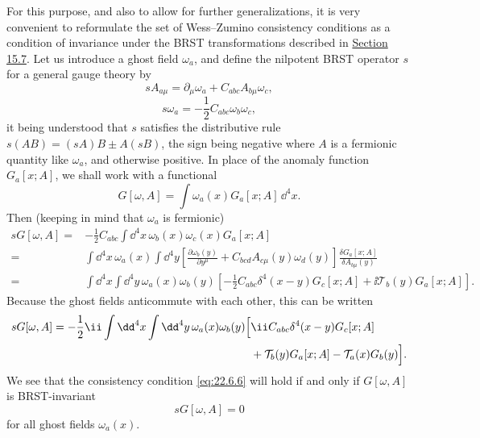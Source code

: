 For this purpose, and also to allow for further generalizations, it is very
convenient to reformulate the set of Wess--Zumino consistency conditions
as a condition of invariance under the BRST transformations described in
\hyperref[sec:15.7]{Section 15.7}. Let us introduce a ghost field
$\omega_a$, and define the nilpotent BRST operator $s$ for a general
gauge theory by
\begin{equation}
 sA_{a\mu}
 =\partial_\mu\omega_a
 +C_{abc}A_{b\mu}\omega_c,
 \tag{22.6.7}\label{eq:22.6.7}
\end{equation}
\begin{equation}
 s\omega_a
 =-\frac12 C_{abc}\omega_b\omega_c,
 \tag{22.6.8}\label{eq:22.6.8}
\end{equation}
it being understood that $s$ satisfies the distributive rule
$s(AB)=(sA)B\pm A(sB)$, the sign being negative where $A$ is a fermionic
quantity like $\omega_a$, and otherwise positive. In place of the
anomaly function $G_a[x;A]$, we shall work with a functional
\begin{equation}
 G[\omega,A]
 =\int\omega_a(x)G_a[x;A]\,\dd^4x.
 \tag{22.6.9}\label{eq:22.6.9}
\end{equation}
Then (keeping in mind that $\omega_a$ is fermionic)
\begin{align*}
 sG[\omega,A]
 ={}&-\frac12 C_{abc}
 \int \dd^4x\,\omega_b(x)\omega_c(x)G_a[x;A]
 \\
 ={}&\int \dd^4x\,\omega_a(x)\int \dd^4y
 \left[
 \frac{\partial\omega_b(y)}{\partial y^\mu}
 +C_{bcd}A_{c\mu}(y)\omega_d(y)
 \right]
 \frac{\delta G_a[x;A]}{\delta A_{b\mu}(y)}
 \\
 ={}&\int \dd^4x\int \dd^4y\,\omega_a(x)\omega_b(y)
 \left[
 -\frac12 C_{abc}\delta^4(x-y)G_c[x;A]
 +\ii\mathcal T_b(y)G_a[x;A]
 \right].
\end{align*}
Because the ghost fields anticommute with each other, this can be written
\[
 \begin{aligned}
 sG[\omega,A]
 =-\frac12 \ii\int \dd^4x\int \dd^4y\,
 \omega_a(x)\omega_b(y)
 \Bigl[
 &\ii C_{abc}\delta^4(x-y)G_c[x;A]
 \\
 &+\mathcal T_b(y)G_a[x;A]
 -\mathcal T_a(x)G_b(y)
 \Bigr].
 \end{aligned}
\]
We see that the consistency condition \eqref{eq:22.6.6} will hold if and
only if $G[\omega,A]$ is BRST-invariant
\begin{equation}
 sG[\omega,A]=0
 \tag{22.6.10}\label{eq:22.6.10}
\end{equation}
for all ghost fields $\omega_a(x)$.

